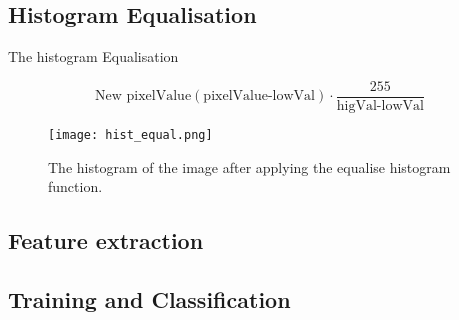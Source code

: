 \subsection{Histogram Equalisation}
The histogram Equalisation

\begin{equation}\label{eq:hist_stretch}
	\text{New~pixelValue} (\text{pixelValue-lowVal})\cdot\frac{255}{\text{higVal-lowVal}}
\end{equation}


\begin{figure}[h]
\centering
\texttt{[image: hist\_equal.png]}
\caption{The histogram of the image after applying the equalise histogram function.}
\label{fig:histEq}
\end{figure}

\subsection{Feature extraction}


\subsection{Training and Classification}